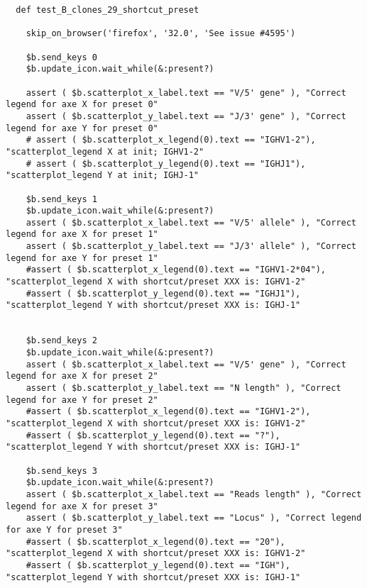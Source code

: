 \begin{verbatim}
  def test_B_clones_29_shortcut_preset

    skip_on_browser('firefox', '32.0', 'See issue #4595')

    $b.send_keys 0
    $b.update_icon.wait_while(&:present?)

    assert ( $b.scatterplot_x_label.text == "V/5' gene" ), "Correct legend for axe X for preset 0"
    assert ( $b.scatterplot_y_label.text == "J/3' gene" ), "Correct legend for axe Y for preset 0"
    # assert ( $b.scatterplot_x_legend(0).text == "IGHV1-2"), "scatterplot_legend X at init; IGHV1-2"
    # assert ( $b.scatterplot_y_legend(0).text == "IGHJ1"), "scatterplot_legend Y at init; IGHJ-1"

    $b.send_keys 1
    $b.update_icon.wait_while(&:present?)
    assert ( $b.scatterplot_x_label.text == "V/5' allele" ), "Correct legend for axe X for preset 1"
    assert ( $b.scatterplot_y_label.text == "J/3' allele" ), "Correct legend for axe Y for preset 1"
    #assert ( $b.scatterplot_x_legend(0).text == "IGHV1-2*04"), "scatterplot_legend X with shortcut/preset XXX is: IGHV1-2"
    #assert ( $b.scatterplot_y_legend(0).text == "IGHJ1"), "scatterplot_legend Y with shortcut/preset XXX is: IGHJ-1"


    $b.send_keys 2
    $b.update_icon.wait_while(&:present?)
    assert ( $b.scatterplot_x_label.text == "V/5' gene" ), "Correct legend for axe X for preset 2"
    assert ( $b.scatterplot_y_label.text == "N length" ), "Correct legend for axe Y for preset 2"
    #assert ( $b.scatterplot_x_legend(0).text == "IGHV1-2"), "scatterplot_legend X with shortcut/preset XXX is: IGHV1-2"
    #assert ( $b.scatterplot_y_legend(0).text == "?"), "scatterplot_legend Y with shortcut/preset XXX is: IGHJ-1"

    $b.send_keys 3
    $b.update_icon.wait_while(&:present?)
    assert ( $b.scatterplot_x_label.text == "Reads length" ), "Correct legend for axe X for preset 3"
    assert ( $b.scatterplot_y_label.text == "Locus" ), "Correct legend for axe Y for preset 3"
    #assert ( $b.scatterplot_x_legend(0).text == "20"), "scatterplot_legend X with shortcut/preset XXX is: IGHV1-2"
    #assert ( $b.scatterplot_y_legend(0).text == "IGH"), "scatterplot_legend Y with shortcut/preset XXX is: IGHJ-1"


\end{verbatim}
